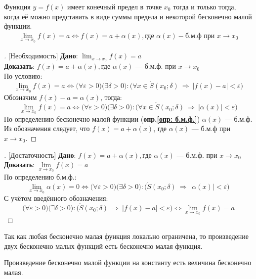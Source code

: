 \begin{theorem}
  Функция $y = f(x)$ имеет конечный предел в точке  $x_0$ тогда и только тогда, когда её можно представить в виде суммы предела и некоторой бесконечно малой функции.
  \begin{gather*}
    \lim_{x \to x_0} f(x) = a \iff f(x) = a + \alpha(x), \text{где } \alpha(x) - \text{б.м.ф при } x \to x_0
  \end{gather*}
\end{theorem}
\begin{proof}[][Необходимость]
  \textbf{Дано}: $\displaystyle \lim_{x \to x_0} f(x) = a$ \\
  \textbf{Доказать}: $\displaystyle f(x) = a + \alpha(x), \text{где } \alpha(x) \text{ --- б.м.ф. при } x \to  x_0 $ \\[1ex]
  По условию: \[
    \lim_{x \to x_0} f(x) = a \iff \big(\forall \varepsilon > 0\big)\big(\exists \delta > 0\big)\colon \big(\forall x \in \mathring{S}(x_0; \delta)\ \Rightarrow\ |f(x) - a| < \varepsilon\big)  
  \]
  Обозначим $f(x) - a = \alpha(x)$, тогда: \[
    \lim_{x \to x_0} f(x) = a \iff \big(\forall \varepsilon > 0\big)\big(\exists \delta > 0\big)\colon \big(\forall x \in \mathring{S}(x_0; \delta)\ \Rightarrow\ |\alpha(x)| < \varepsilon\big)  
  \]
  По определению бесконечно малой функции (\textbf{опр.\ref{опр: б.м.ф.}}) $\alpha(x)$ --- б.м.ф. \\
  Из обозначения следует, что $f(x) = a + \alpha(x)$, где $\alpha(x)$ --- б.м.ф при $x \to x_0$.
\end{proof}
\begin{proof}[][Достаточность]
  \textbf{Дано}: $f(x) = a + \alpha(x), \text{где } \alpha(x) \text{ --- б.м.ф. при } x \to x_0$ \\
  \textbf{Доказать}: $\lim\limits_{x \to x_0} f(x) = a$ \\[1ex]
  По определению б.м.ф.: \[
    \lim_{x \to x_0} \alpha(x) = 0 \iff \big(\forall \varepsilon > 0\big)\big(\exists \delta > 0\big)\colon \big(\mathring{S}(x_0; \delta)\ \Rightarrow\ |\alpha(x)| < \varepsilon\big)
  \]
  С учётом введённого обозначения: \[
    \big(\forall \varepsilon > 0\big)\big(\exists \delta > 0\big)\colon \big(\mathring{S}(x_0; \delta)\ \Rightarrow\ |f(x) - a| < \varepsilon\big) \iff \lim_{x \to x_0} f(x) = a
  \]
\end{proof}
\begin{corollary}
  Так как любая бесконечно малая функция локально ограничена, то произведение двух бесконечно малых функций есть бесконечно малая функция.
\end{corollary}
\begin{corollary}
  Произведение бесконечно малой функции на константу есть величина бесконечно малая.
\end{corollary}

